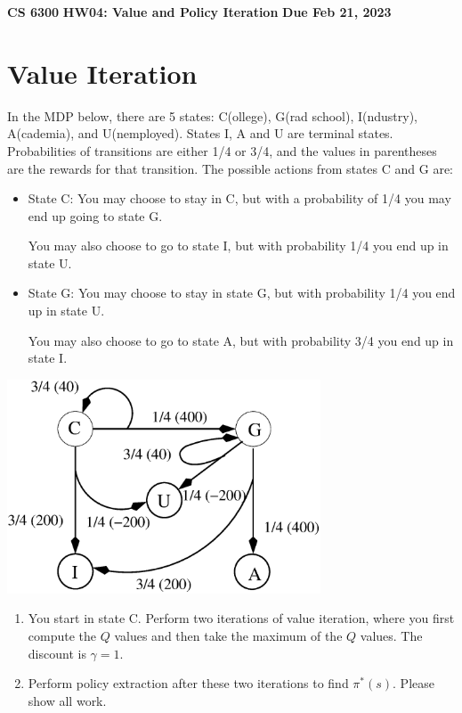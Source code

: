 \documentclass[12pt]{article}
\begin{document}
\begin{center}
{\bf CS 6300} \hfill {\large\bf HW04: Value and Policy Iteration} \hfill {\bf Due Feb 21, 2023}
\end{center}

\section{Value Iteration}

In the MDP below, there are 5 states: C(ollege), G(rad school),
I(ndustry), A(cademia), and U(nemployed).  States I, A and U are
terminal states.  Probabilities of transitions are either 1/4 or 3/4,
and the values in parentheses are the rewards for that transition.
The possible actions from states C and G are:

      \begin{itemize}

      \item State C: You may choose to stay in C, but with a
        probability of 1/4 you may end up going to state G.

        You may also choose to go to state I, but with probability 1/4
        you end up in state U.

      \item State G: You may choose to stay in state G, but with
        probability 1/4 you end up in state U.

        You may also choose to go to state A, but with probability 3/4
        you end up in state I.

      \end{itemize}

  \begin{center}
  \includegraphics[height=2.5in]{cgiau.eps}
  \end{center}

\begin{enumerate}

\item You start in state C.  Perform two iterations of value
iteration, where you first compute the $Q$ values and then take
the maximum of the $Q$ values.  The discount is $\gamma = 1$.

\item Perform policy extraction after these two iterations to find $\pi^*(s)$.  Please show
    all work.

\end{enumerate}
\end{document}
